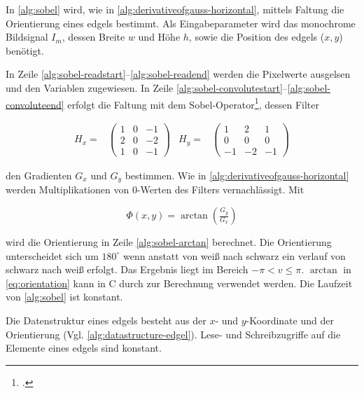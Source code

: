 In \autoref{alg:sobel} wird, wie in \autoref{alg:derivativeofgauss-horizontal}, mittels Faltung die Orientierung eines \gls{edgels} bestimmt. Als Eingabeparameter wird das monochrome Bildsignal $I_m$, dessen Breite $w$ und Höhe $h$, sowie die Position des \gls{edgels} ($x,y$) benötigt.



In Zeile \ref{alg:sobel-readstart}--\ref{alg:sobel-readend} werden die Pixelwerte ausgelsen und den Variablen zugewiesen. In Zeile \ref{alg:sobel-convolutestart}--\ref{alg:sobel-convoluteend} erfolgt die Faltung mit dem Sobel-Operator\footcite[Vgl.][S.~120--123]{burger05}, dessen Filter

\begin{subequations}
\begin{align}
	H_x =&
	\begin{pmatrix}
		1& 0& -1\\
		2& 0& -2\\
		1& 0& -1
	\end{pmatrix}
\end{align}
\begin{align}
	H_y =&
	\begin{pmatrix}
		1& 2& 1\\
		0& 0& 0\\
		-1& -2& -1
	\end{pmatrix}
\end{align}
\end{subequations}

den Gradienten $G_x$ und $G_y$ bestimmen. Wie in \autoref{alg:derivativeofgauss-horizontal} werden Multiplikationen von $0$-Werten des Filters vernachlässigt. Mit

\begin{equation}
	\label{eq:orientation}
	\Phi(x,y) = \arctan{\left(\tfrac{G_y}{G_x}\right)}
\end{equation}

wird die Orientierung in Zeile \autoref{alg:sobel-arctan} berechnet. Die Orientierung unterscheidet sich um $180^\circ$
 wenn anstatt von weiß nach schwarz ein verlauf von schwarz nach weiß erfolgt. Das Ergebnis liegt im Bereich
 $-\pi < v \leq \pi$. $\arctan$ in \autoref{eq:orientation} kann in C durch  zur Berechnung verwendet
 werden. Die Laufzeit von \autoref{alg:sobel} ist konstant.

Die Datenstruktur eines \gls{edgels} besteht aus der $x$- und $y$-Koordinate und der Orientierung
 (Vgl. \autoref{alg:datastructure-edgel}). Lese- und Schreibzugriffe auf die Elemente eines \gls{edgels} sind konstant.

